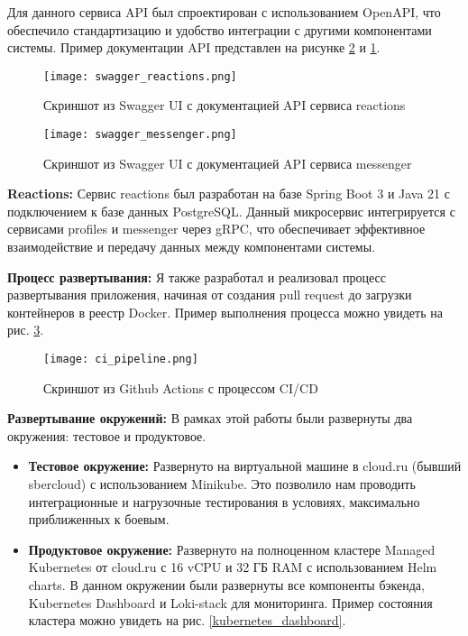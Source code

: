 Для данного сервиса API был спроектирован с использованием OpenAPI, что обеспечило стандартизацию и удобство интеграции с другими компонентами системы. Пример документации API представлен на рисунке \ref{swagger_messenger} и \ref{swagger_reactions}.

\begin{figure}[h]
    \centering
    \texttt{[image: swagger\_reactions.png]}
    \caption{Скриншот из Swagger UI с документацией API сервиса reactions}
    \label{swagger_reactions}
\end{figure}

\begin{figure}[h]
    \centering
    \texttt{[image: swagger\_messenger.png]}
    \caption{Скриншот из Swagger UI с документацией API сервиса messenger}
    \label{swagger_messenger}
\end{figure}

\textbf{Reactions:} 
Сервис reactions был разработан на базе Spring Boot 3 и Java 21 с подключением к базе данных PostgreSQL. Данный микросервис интегрируется с сервисами profiles и messenger через gRPC, что обеспечивает эффективное взаимодействие и передачу данных между компонентами системы.

\textbf{Процесс развертывания:}
Я также разработал и реализовал процесс развертывания приложения, начиная от создания pull request до загрузки контейнеров в реестр Docker. Пример выполнения процесса можно увидеть на рис. \ref{ci_pipeline}. 

\begin{figure}[h]
    \centering
    \texttt{[image: ci\_pipeline.png]}
    \caption{Скриншот из Github Actions с процессом CI/CD}
    \label{ci_pipeline}
\end{figure}

\textbf{Развертывание окружений:}
В рамках этой работы были развернуты два окружения: тестовое и продуктовое.

\begin{itemize}
    \item \textbf{Тестовое окружение:} Развернуто на виртуальной машине в cloud.ru (бывший sbercloud) с использованием Minikube. Это позволило нам проводить интеграционные и нагрузочные тестирования в условиях, максимально приближенных к боевым.
    \item \textbf{Продуктовое окружение:} Развернуто на полноценном кластере Managed Kubernetes от cloud.ru с 16 vCPU и 32 ГБ RAM с использованием Helm charts. В данном окружении были развернуты все компоненты бэкенда, Kubernetes Dashboard и Loki-stack для мониторинга. Пример состояния кластера можно увидеть на рис. \ref{kubernetes_dashboard}.
\end{itemize}

